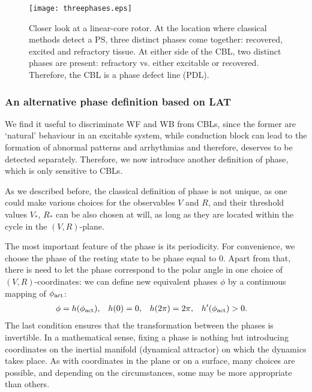 \documentclass{article}
\newcommand{\phiact}{\ensuremath{\phi_{\rm act}}}
\newcommand{\VS}{V_*}
\newcommand{\RS}{R_*}
\begin{document}
 \begin{figure}
     \centering
     \texttt{[image: threephases.eps]}
     \caption{Closer look at a linear-core rotor. At the location where classical methods detect a PS, three distinct phases come together: recovered, excited and refractory tissue. At either side of the CBL, two distinct phases are present: refractory vs. either excitable or recovered. Therefore, the CBL is a phase defect line (PDL).}
     \label{fig:phasediagram}
 \end{figure}


\subsubsection{An alternative phase definition based on LAT}


We find it useful to discriminate WF and WB from CBLs, since the former are `natural' behaviour in an excitable system, while conduction block can lead to the formation of abnormal patterns and arrhythmias and therefore, deserves to be detected separately. Therefore, we now introduce another definition of phase, which is only sensitive to CBLs.

As we described before, the classical definition of phase is not unique, as one could make various choices for the observables $V$ and $R$, and their threshold values $\VS$, $\RS$ can be also chosen at will, as long as they are located within the cycle in the $(V,R)$-plane. 

The most important feature of the phase is its periodicity. For convenience, we choose the phase of the resting state to be phase equal to $0$. Apart from that, there is need to let the phase correspond to the polar angle in one choice of $(V,R)$-coordinates: we can define new equivalent phases $\phi$ by a continuous mapping of $\phiact$: 
\begin{align}
    \phi &= h(\phiact), & h(0) &= 0, & h(2\pi) &=2\pi, & h'(\phiact) &>0.
\end{align}
The last condition ensures that the transformation between the phases is invertible. In a mathematical sense, fixing a phase is nothing but introducing coordinates on the inertial manifold (dynamical attractor) on which the dynamics takes place. As with coordinates in the plane or on a surface, many choices are possible, and depending on the circumstances, some may be more appropriate than others. 
\end{document}
